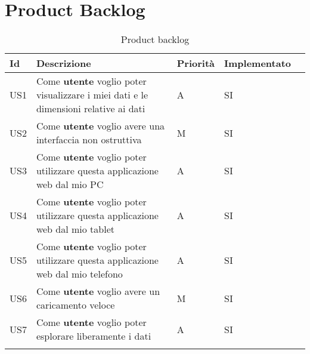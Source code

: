 \section{Product Backlog}
\begin{longtable} {
		|>{}p{10mm}| 
		|>{}p{70mm}|
		|>{}p{15mm}|
		|>{}p{25mm}|
		>{}p{0mm}}
	\hline
	\textbf{Id} & \textbf{Descrizione} & \textbf{Priorità} & \textbf{Implementato} \\ \hline
	US1 & Come \textbf{utente} voglio poter visualizzare i miei dati e le dimensioni relative ai dati & A & SI \\ \hline
	
	US2 & Come \textbf{utente} voglio avere una interfaccia non ostruttiva & M & SI \\ \hline
	
	US3 & Come \textbf{utente} voglio poter utilizzare questa applicazione web dal mio PC & A & SI \\ \hline
	
	US4 & Come \textbf{utente} voglio poter utilizzare questa applicazione web dal mio tablet & A & SI \\ \hline
	
	US5 & Come \textbf{utente} voglio poter utilizzare questa applicazione web dal mio telefono & A & SI \\ \hline
	
	US6 & Come \textbf{utente} voglio avere un caricamento veloce & M & SI \\ \hline
	
	US7 & Come \textbf{utente} voglio poter esplorare liberamente i dati & A & SI \\ \hline
	\caption{Product backlog}
\end{longtable}
\newpage
